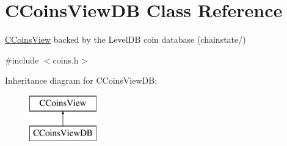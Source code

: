\hypertarget{class_c_coins_view_d_b}{}\section{C\+Coins\+View\+D\+B Class Reference}
\label{class_c_coins_view_d_b}


\hyperlink{class_c_coins_view}{C\+Coins\+View} backed by the Level\+D\+B coin database (chainstate/)  




{\ttfamily \#include $<$coins.\+h$>$}

Inheritance diagram for C\+Coins\+View\+D\+B\+:\begin{figure}[H]
\begin{center}
\leavevmode
\includegraphics[height=2.000000cm]{class_c_coins_view_d_b}
\end{center}
\end{figure}
